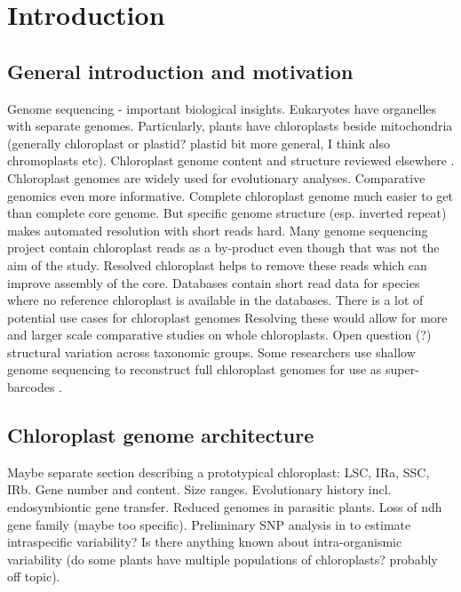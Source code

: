 \documentclass{bmcart}
\begin{document}

\section*{Introduction}
\subsection*{General introduction and motivation}
Genome sequencing - important biological insights.
Eukaryotes have organelles with separate genomes.
Particularly, plants have chloroplasts beside mitochondria (generally chloroplast or plastid? plastid bit more general, I think also chromoplasts etc).
Chloroplast genome content and structure reviewed elsewhere \cite{wicke_evolution_2011,green_chloroplast_2011}.
Chloroplast genomes are widely used for evolutionary analyses.
Comparative genomics even more informative.
Complete chloroplast genome much easier to get than complete core genome.
But specific genome structure (esp. inverted repeat) makes automated resolution with short reads hard.
Many genome sequencing project contain chloroplast reads as a by-product even though that was not the aim of the study.
Resolved chloroplast helps to remove these reads which can improve assembly of the core.
Databases contain short read data for species where no reference chloroplast is available in the databases.
There is a lot of potential use cases for chloroplast genomes \cite{tonti-filippini_what_2017}
Resolving these would allow for more and larger scale comparative studies on whole chloroplasts.
Open question (?) structural variation across taxonomic groups.
Some researchers use shallow genome sequencing to reconstruct full chloroplast genomes for use as super-barcodes \cite{coissac_barcodes_2016}.

\subsection*{Chloroplast genome architecture}
Maybe separate section describing a prototypical chloroplast: LSC, IRa, SSC, IRb. Gene number and content. Size ranges. Evolutionary history incl. endosymbiontic gene transfer. Reduced genomes in parasitic plants. Loss of ndh gene family (maybe too specific). Preliminary SNP analysis in  to estimate intraspecific variability? Is there anything known about intra-organismic variability (do some plants have multiple populations of chloroplasts? probably off topic).
\end{document}
